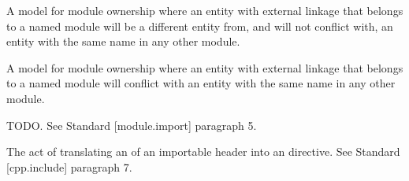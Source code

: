 A model for module ownership where an entity with external linkage that belongs
to a named module will be a different entity from, and will not conflict with,
an entity with the same name in any other module.

A model for module ownership where an entity with external linkage that belongs
to a named module will conflict with an entity with the same name in any other
module.

TODO.
See \Cpp{} Standard [module.import] paragraph 5.

The act of translating an  of an importable header into an
 directive.
See \Cpp{} Standard [cpp.include] paragraph 7.

%

